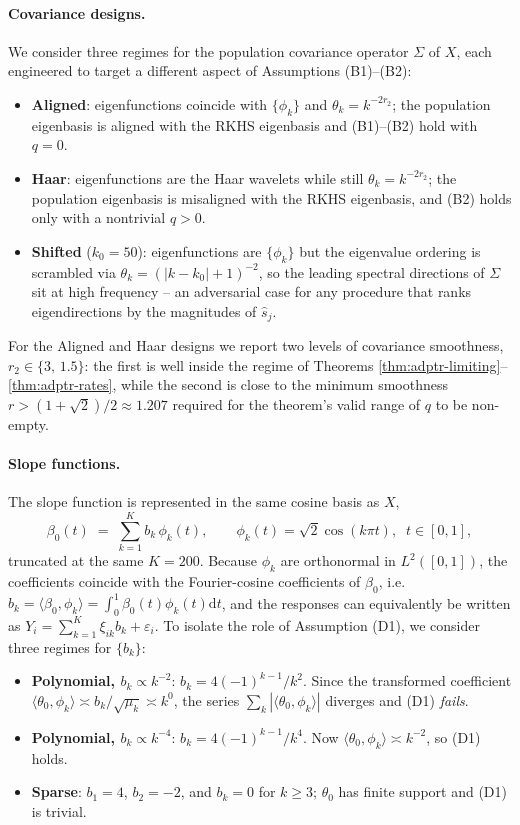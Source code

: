 \documentclass[11pt,a4paper]{article}
\renewcommand{\hat}{\widehat}
\theoremstyle{definition}
\theoremstyle{plain}
\theoremstyle{remark}
\newcommand{\ud}{\mathrm d}
\begin{document}
\paragraph{Covariance designs.}
We consider three regimes for the population covariance operator $\Sigma$ of $X$, each engineered to target a different aspect of Assumptions (B1)--(B2):
\begin{itemize}
\item \textbf{Aligned}: eigenfunctions coincide with $\{\phi_k\}$ and $\theta_k=k^{-2r_2}$; the population eigenbasis is aligned with the RKHS eigenbasis and (B1)--(B2) hold with $q=0$.
\item \textbf{Haar}: eigenfunctions are the Haar wavelets while still $\theta_k=k^{-2r_2}$; the population eigenbasis is misaligned with the RKHS eigenbasis, and (B2) holds only with a nontrivial $q>0$.
\item \textbf{Shifted} ($k_0=50$): eigenfunctions are $\{\phi_k\}$ but the eigenvalue ordering is scrambled via $\theta_k=(|k-k_0|+1)^{-2}$, so the leading spectral directions of $\Sigma$ sit at high frequency -- an adversarial case for any procedure that ranks eigendirections by the magnitudes of $\hat s_j$.
\end{itemize}
For the Aligned and Haar designs we report two levels of covariance smoothness, $r_2\in\{3,\,1.5\}$: the first is well inside the regime of Theorems \ref{thm:adptr-limiting}--\ref{thm:adptr-rates}, while the second is close to the minimum smoothness $r>(1+\sqrt 2)/2\approx 1.207$ required for the theorem's valid range of $q$ to be non-empty.

\paragraph{Slope functions.}
The slope function is represented in the same cosine basis as $X$,
\[
\beta_0(t)\;=\;\sum_{k=1}^{K} b_k\,\phi_k(t),\qquad \phi_k(t)=\sqrt 2\cos(k\pi t),\;\; t\in[0,1],
\]
truncated at the same $K=200$. Because $\phi_k$ are orthonormal in $L^2([0,1])$, the coefficients coincide with the Fourier-cosine coefficients of $\beta_0$, i.e.\ $b_k=\langle\beta_0,\phi_k\rangle=\int_0^1\beta_0(t)\phi_k(t)\ud t$, and the responses can equivalently be written as $Y_i=\sum_{k=1}^{K}\xi_{ik}b_k+\varepsilon_i$. To isolate the role of Assumption (D1), we consider three regimes for $\{b_k\}$:
\begin{itemize}
\item \textbf{Polynomial, $b_k\propto k^{-2}$}: $b_k=4(-1)^{k-1}/k^{2}$. Since the transformed coefficient $\langle\theta_0,\phi_k\rangle\asymp b_k/\sqrt{\mu_k}\asymp k^{0}$, the series $\sum_k|\langle\theta_0,\phi_k\rangle|$ diverges and (D1) \emph{fails}.
\item \textbf{Polynomial, $b_k\propto k^{-4}$}: $b_k=4(-1)^{k-1}/k^{4}$. Now $\langle\theta_0,\phi_k\rangle\asymp k^{-2}$, so (D1) holds.
\item \textbf{Sparse}: $b_1=4$, $b_2=-2$, and $b_k=0$ for $k\geq 3$; $\theta_0$ has finite support and (D1) is trivial.
\end{itemize}
\end{document}
